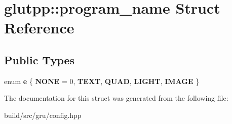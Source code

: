 \hypertarget{structglutpp_1_1program__name}{\section{glutpp\-:\-:program\-\_\-name \-Struct \-Reference}
\label{structglutpp_1_1program__name}
}
\subsection*{\-Public \-Types}
\begin{DoxyCompactItemize}
\item 
enum {\bfseries e} \{ \*
{\bfseries \-N\-O\-N\-E} =  0, 
{\bfseries \-T\-E\-X\-T}, 
{\bfseries \-Q\-U\-A\-D}, 
{\bfseries \-L\-I\-G\-H\-T}, 
\*
{\bfseries \-I\-M\-A\-G\-E}
 \}
\end{DoxyCompactItemize}


\-The documentation for this struct was generated from the following file\-:\begin{DoxyCompactItemize}
\item 
build/src/gru/config.\-hpp\end{DoxyCompactItemize}
